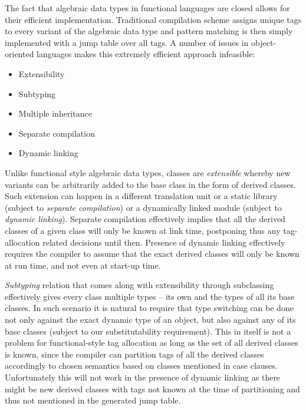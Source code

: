 \documentclass[preprint]{sigplanconf}
\begin{document}
The fact that algebraic data types in functional languages are closed allows for 
their efficient implementation. Traditional compilation scheme assigns unique 
tags to every variant of the algebraic data type and pattern matching is then 
simply implemented with a jump table over all tags. A number of issues in 
object-oriented languages makes this extremely efficient approach infeasible:

\begin{itemize}
\setlength{\itemsep}{0pt}
\setlength{\parskip}{0pt}
\item Extensibility
\item Subtyping
\item Multiple inheritance
\item Separate compilation
\item Dynamic linking 
\end{itemize}

\noindent
Unlike functional style algebraic data types, classes are \emph{extensible} 
whereby new variants can be arbitrarily added to the base class in the form of 
derived classes. Such extension can happen in a different translation unit or a
static library (subject to \emph{separate compilation}) or a dynamically linked 
module (subject to \emph{dynamic linking}). Separate compilation effectively 
implies that all the derived classes of a given class will only be known at link 
time, postponing thus any tag-allocation related decisions until then.
Presence of dynamic linking effectively requires the compiler to assume that the 
exact derived classes will only be known at run time, and not even at start-up 
time.


\emph{Subtyping} relation that comes along with extensibility through 
subclassing effectively gives every class multiple types -- its own and the 
types of all its base classes. In such scenario it is natural to require that 
type switching can be done not only against the exact dynamic type of an object, 
but also against any of its base classes (subject to our substitutability 
requirement). This in itself is not a problem for functional-style tag 
allocation as long as the set of all derived classes is known, since the 
compiler can partition tags of all the derived classes accordingly to chosen 
semantics based on classes mentioned in case clauses.
Unfortunately this will not work in the presence of dynamic linking as there 
might be new derived classes with tags not known at the time of partitioning and 
thus not mentioned in the generated jump table.
\end{document}
